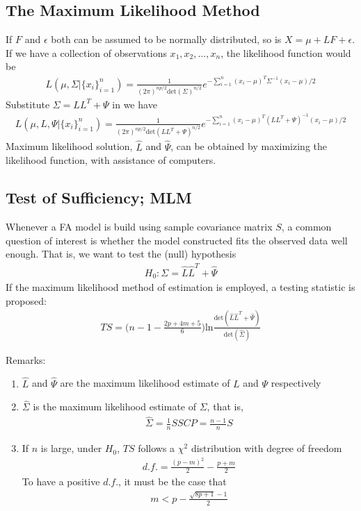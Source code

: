 \documentclass[12pt]{extarticle}
\newcommand{\<}{\langle}
\renewcommand{\>}{\rangle}
\theoremstyle{definition}
\begin{document}
\subsection{The Maximum Likelihood Method}
If $F$ and $\epsilon$ both can be assumed to be normally distributed, so is $X = \mu +LF+\epsilon$.\\
If we have a collection of observations $x_1,x_2,...,x_n$, the likelihood function would be
\begin{align*}
    L(\mu,\Sigma|\{x_i\}^n_{i=1})=\frac{1}{(2\pi)^{np/2} \text{det}(\Sigma)^{n/2}}e^{-\sum^n_{i=1}(x_i -\mu)^T \Sigma^{-1}(x_i -\mu)/2}
\end{align*}
Substitute $\Sigma =LL^T +\Psi$ in we have
\begin{align*}
    L(\mu,L,\Psi|\{x_i\}^n_{i=1}) = \frac{1}{(2\pi)^{np/2} \text{det}(LL^T +\Psi)^{n/2}}e^{-\sum^n_{i=1}(x_i -\mu)^T (LL^T +\Psi)^{-1}(x_i -\mu)/2}
\end{align*}
Maximum likelihood solution, $\hat{L}$ and $\hat{\Psi}$, can be obtained by maximizing the likelihood function, with assistance of computers.

\subsection{Test of Sufficiency; MLM}
\begin{tcolorbox}[enhanced, drop fuzzy shadow, title=Test of Sufficiency]
Whenever a FA model is build using sample covariance matrix $S$, a common question of interest is whether the model constructed fits the observed data well enough. That is, we want to test the (null) hypothesis
\begin{align*}
    H_0: \Sigma=\hat{L}\hat{L}^T +\hat{\Psi}
\end{align*}
If the maximum likelihood method of estimation is employed, a testing statistic is proposed:
\begin{align*}
    TS = \bigg(n-1-\frac{2p+4m+5}{6}\bigg)\text{ln}\frac{\text{det}(\hat{L}\hat{L}^T +\hat{\Psi})}{\text{det}(\hat{\Sigma})}
\end{align*}
\end{tcolorbox}

Remarks:
\begin{enumerate}
    \item $\hat{L}$ and $\hat{\Psi}$ are the maximum likelihood estimate of $L$ and $\Psi$ respectively
    \item $\hat{\Sigma}$ is the maximum likelihood estimate of $\Sigma$, that is,
    \begin{align*}
        \hat{\Sigma}=\frac{1}{n}SSCP=\frac{n-1}{n}S
    \end{align*}
    \item If $n$ is large, under $H_0$, $TS$ follows a $\chi^2$ distribution with degree of freedom
    \begin{align*}
        d.f.=\frac{(p-m)^2}{2}-\frac{p+m}{2}
    \end{align*}
    To have a positive $d.f.$, it must be the case that
    \begin{align*}
        m<p-\frac{\sqrt{8p+1}-1}{2}
    \end{align*}
\end{enumerate}
\end{document}
